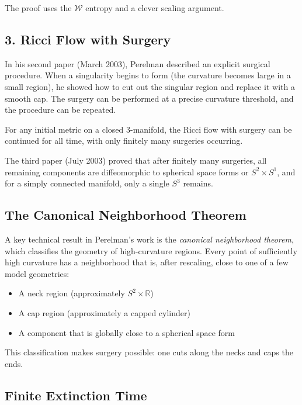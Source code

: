 The proof uses the $\mathcal{W}$ entropy and a clever scaling argument.

\subsection{3. Ricci Flow with Surgery}

In his second paper (March 2003), Perelman described an explicit surgical procedure. When a singularity begins to form (the curvature becomes large in a small region), he showed how to cut out the singular region and replace it with a smooth cap. The surgery can be performed at a precise curvature threshold, and the procedure can be repeated.

\begin{theorem}[Perelman, 2003]
For any initial metric on a closed 3-manifold, the Ricci flow with surgery can be continued for all time, with only finitely many surgeries occurring.
\end{theorem}

The third paper (July 2003) proved that after finitely many surgeries, all remaining components are diffeomorphic to spherical space forms or $S^2 \times S^1$, and for a simply connected manifold, only a single $S^3$ remains.

\subsection{The Canonical Neighborhood Theorem}

A key technical result in Perelman's work is the \textit{canonical neighborhood theorem}, which classifies the geometry of high-curvature regions. Every point of sufficiently high curvature has a neighborhood that is, after rescaling, close to one of a few model geometries:
\begin{itemize}
  \item A neck region (approximately $S^2 \times \mathbb{R}$)
  \item A cap region (approximately a capped cylinder)
  \item A component that is globally close to a spherical space form
\end{itemize}

This classification makes surgery possible: one cuts along the necks and caps the ends.

\subsection{Finite Extinction Time}

